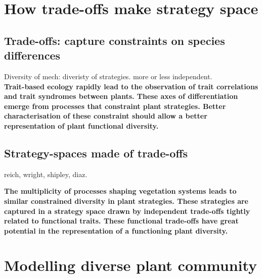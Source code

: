 



\section{How trade-offs make strategy space}

\subsection{Trade-offs: capture constraints on species differences}

Diversity of mech: diveristy of strategies. more or less independent.\\

\textbf{Trait-based ecology rapidly lead to the observation of trait correlations and trait syndromes between plants. These axes of differentiation emerge from processes that constraint plant strategies. Better characterisation of these constraint should allow a better representation of plant functional diversity.}

\subsection{Strategy-spaces made of trade-offs}

reich, wright, shipley, diaz.

\textbf{The multiplicity of processes shaping vegetation systems leads to similar constrained diversity in plant strategies. These strategies are captured in a strategy space drawn by independent trade-offs tightly related to functional traits. These functional trade-offs have great potential in the representation of a functioning plant diversity.}



\section{Modelling diverse plant community}

